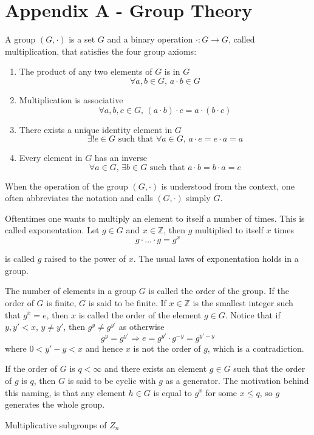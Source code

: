 \clearpage
\section{Appendix A - Group Theory}

A group $(G, \cdot)$ is a set $G$ and a binary operation $\cdot: G \to G$, called
multiplication, that satisfies the four group axioms:
\begin{enumerate}
\item The product of any two elements of $G$ is in $G$
$$\forall a,b \in G, \, a\cdot b \in G$$

\item Multiplication is associative 
$$
\forall a,b,c \in G, \, (a\cdot b)\cdot c = a \cdot (b \cdot c)
$$ 
\item There exists a unique identity element in $G$
$$
\exists! e \in G \text{ such that } \forall a \in G, \, a \cdot e = e \cdot a = a
$$
\item Every element in $G$ has an inverse
$$
\forall a \in G, \, \exists b \in G \text{ such that } a \cdot b = b \cdot a = e
$$
\end{enumerate}

When the operation of the group $(G, \cdot)$ is understood from the
context, one often abbreviates the notation and calls $(G, \cdot)$
simply $G$.

Oftentimes one wants to multiply an element to itself a number of
times. This is called exponentation. Let $g \in G$ and
$x \in \mathbb{Z}$, then $g$ multiplied to itself $x$ times
$$
g \cdot ... \cdot g = g^x
$$

is called $g$ raised to the power of $x$. The usual laws of
exponentation holds in a group.

The number of elements in a group $G$ is called the order of the
group. If the order of $G$ is finite, $G$ is said to be finite. If
$x \in \mathbb{Z}$ is the smallest integer such that $g^x = e$, then
$x$ is called the order of the element $g \in G$. Notice that if
$y,y' < x$, $y \neq y'$, then $g^y \neq g^{y'}$ as otherwise
$$
g^y = g^{y'} \Rightarrow e = g^{y'} \cdot g^{-y} = g^{y' - y}
$$
where $0 < y' - y < x$ and hence $x$ is not the order of $g$, which is
a contradiction.

If the order of $G$ is $q < \infty$ and there exists an element $g \in
G$ such that the order of $g$ is $q$, then $G$ is said to be cyclic
with $g$ as a generator. The motivation behind this naming, is that
any element $h \in G$ is equal to $g^x$ for some $x \le q$, so $g$
generates the whole group.



Multiplicative subgroups of $Z_n$
